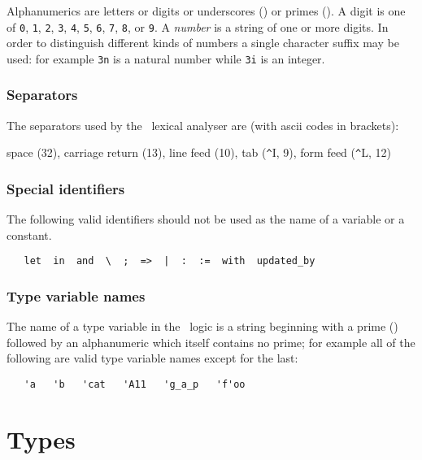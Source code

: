 Alphanumerics are letters or digits or underscores (\ml{\_}) or primes
().  A digit is one of
{\small\verb+0+}, {\small\verb+1+}, {\small\verb+2+}, {\small\verb+3+},
{\small\verb+4+}, {\small\verb+5+}, {\small\verb+6+}, {\small\verb+7+},
{\small\verb+8+}, or {\small\verb+9+}.
A {\it number\/} is a string of one or more digits. In order to
distinguish different kinds of numbers a single character suffix may
be used: for example \verb+3n+ is a natural number while \verb+3i+ is
an integer.

\subsubsection{Separators}

The separators used by the \HOL\ lexical analyser are (with ascii codes in
brackets):

\bigskip

space (32), carriage return (13), line feed (10), tab ({\verb+^+}I, 9),
form feed ({\verb+^+}L, 12)


\subsubsection{Special identifiers}

The following valid identifiers should not be used as the name of
a variable or a constant.

{\small
\begin{verbatim}
   let  in  and  \  ;  =>  |  :  :=  with  updated_by
\end{verbatim}
}

\subsubsection{Type variable names}\label{tyvars}

The name of a type variable in the \HOL\ logic is a string
beginning with a prime () followed by an alphanumeric which itself
contains no prime; for example all of the following are valid type
variable names except for the last:

\begin{hol}
\begin{verbatim}
   'a   'b   'cat   'A11   'g_a_p   'f'oo
\end{verbatim}
\end{hol}


\section{Types}

